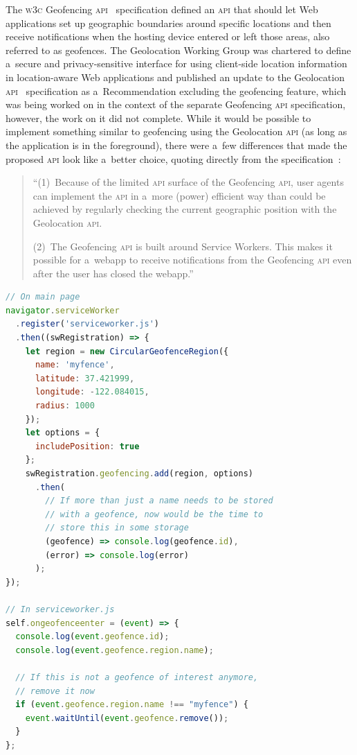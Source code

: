 \documentclass[sigconf,hyphens]{acmart}
\begin{document}
The \textsc{w3c} Geofencing \textsc{api}~\cite{kruisselbrink2017geofencing} specification
defined an \textsc{api} that should let Web applications set up geographic boundaries
around specific locations and then receive notifications when the hosting device
entered or left those areas, also referred to as geofences.
The Geolocation Working Group was chartered to define a~secure and privacy-sensitive interface
for using client-side location information in location-aware Web applications
and published an update to the Geolocation \textsc{api}~\cite{popescu2016geolocation}
specification as a~Recommendation excluding the geofencing feature,
which was being worked on in the context of the separate Geofencing \textsc{api} specification,
however, the work on it did not complete.
While it would be possible to implement something similar to geofencing using the Geolocation
\textsc{api} (as long as the application is in the foreground),
there were a~few differences that made the proposed \textsc{api} look like a~better choice,
quoting directly from the specification~\cite{kruisselbrink2017geofencing}:

\begin{quote}
``(1)~Because of the limited \textsc{api} surface of the Geofencing \textsc{api},
user agents can implement the \textsc{api} in a~more (power) efficient way
than could be achieved by regularly checking the current geographic position with the Geolocation
\textsc{api}.

(2)~The Geofencing \textsc{api} is built around Service Workers.
This makes it possible for a~webapp to receive notifications from the Geofencing \textsc{api}
even after the user has closed the webapp.''	
\end{quote}

\begin{lstlisting}[caption={Geofencing \textsc{api} (conceived example)},
  label=code:geofence, language=JavaScript, float=h] 
// On main page
navigator.serviceWorker
  .register('serviceworker.js')
  .then((swRegistration) => {
    let region = new CircularGeofenceRegion({
      name: 'myfence',
      latitude: 37.421999,
      longitude: -122.084015,
      radius: 1000
    });
    let options = {
      includePosition: true
    };
    swRegistration.geofencing.add(region, options)
      .then(
        // If more than just a name needs to be stored
        // with a geofence, now would be the time to
        // store this in some storage
        (geofence) => console.log(geofence.id),
        (error) => console.log(error)
      );
});

// In serviceworker.js
self.ongeofenceenter = (event) => {
  console.log(event.geofence.id);
  console.log(event.geofence.region.name);

  // If this is not a geofence of interest anymore,
  // remove it now
  if (event.geofence.region.name !== "myfence") {
    event.waitUntil(event.geofence.remove());
  }
};
\end{lstlisting}
\end{document}
